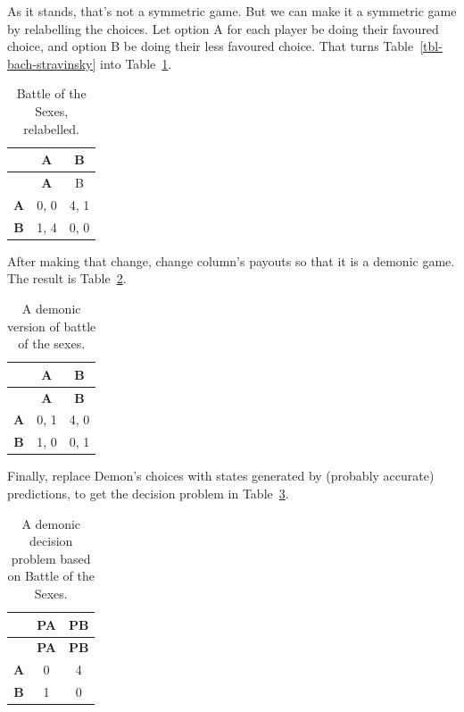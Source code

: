 \documentclass[
  12pt,
  letterpaper,
  DIV=11,
  numbers=noendperiod]{scrreprt}
\begin{document}
As it stands, that's not a symmetric game. But we can make it a
symmetric game by relabelling the choices. Let option A for each player
be doing their favoured choice, and option B be doing their less
favoured choice. That turns Table~\ref{tbl-bach-stravinsky} into
Table~\ref{tbl-bach-stravinsky-symmetric}.

\begin{longtable}[]{@{}ccc@{}}
\caption{Battle of the Sexes,
relabelled.}\label{tbl-bach-stravinsky-symmetric}\tabularnewline
\toprule\noalign{}
& \textbf{A} & B \\
\midrule\noalign{}
\endfirsthead
\toprule\noalign{}
& \textbf{A} & B \\
\midrule\noalign{}
\endhead
\bottomrule\noalign{}
\endlastfoot
\textbf{A} & 0, 0 & 4, 1 \\
\textbf{B} & 1, 4 & 0, 0 \\
\end{longtable}

After making that change, change column's payouts so that it is a
demonic game. The result is Table~\ref{tbl-bach-demon}.

\begin{longtable}[]{@{}ccc@{}}
\caption{A demonic version of battle of the
sexes.}\label{tbl-bach-demon}\tabularnewline
\toprule\noalign{}
& \textbf{A} & \textbf{B} \\
\midrule\noalign{}
\endfirsthead
\toprule\noalign{}
& \textbf{A} & \textbf{B} \\
\midrule\noalign{}
\endhead
\bottomrule\noalign{}
\endlastfoot
\textbf{A} & 0, 1 & 4, 0 \\
\textbf{B} & 1, 0 & 0, 1 \\
\end{longtable}

Finally, replace Demon's choices with states generated by (probably
accurate) predictions, to get the decision problem in
Table~\ref{tbl-asymm-death-damascus}.

\begin{longtable}[]{@{}ccc@{}}
\caption{A demonic decision problem based on Battle of the
Sexes.}\label{tbl-asymm-death-damascus}\tabularnewline
\toprule\noalign{}
& \textbf{PA} & \textbf{PB} \\
\midrule\noalign{}
\endfirsthead
\toprule\noalign{}
& \textbf{PA} & \textbf{PB} \\
\midrule\noalign{}
\endhead
\bottomrule\noalign{}
\endlastfoot
\textbf{A} & 0 & 4 \\
\textbf{B} & 1 & 0 \\
\end{longtable}
\end{document}
